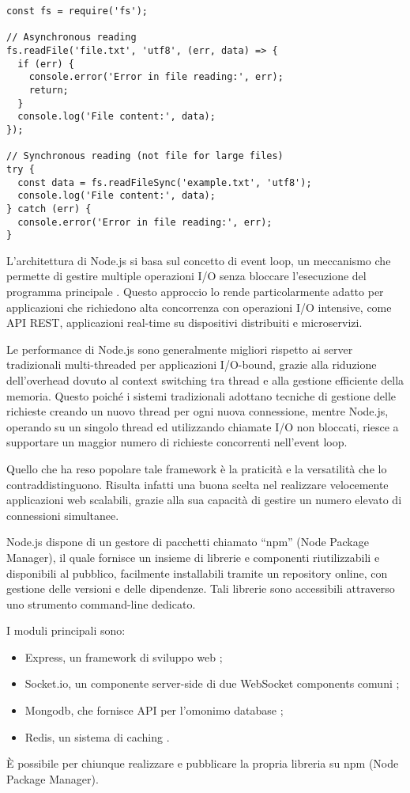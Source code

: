 \begin{lstlisting}[caption={Lettura asincrona di file}, label=lst:node-fs]
const fs = require('fs');

// Asynchronous reading
fs.readFile('file.txt', 'utf8', (err, data) => {
  if (err) {
    console.error('Error in file reading:', err);
    return;
  }
  console.log('File content:', data);
});

// Synchronous reading (not file for large files)
try {
  const data = fs.readFileSync('example.txt', 'utf8');
  console.log('File content:', data);
} catch (err) {
  console.error('Error in file reading:', err);
}
\end{lstlisting}

L'architettura di Node.js si basa sul concetto di event loop, un meccanismo che permette di gestire multiple operazioni I/O senza bloccare l'esecuzione del programma principale \citep{nodejs_docs_2023}. Questo approccio lo rende particolarmente adatto per applicazioni che richiedono alta concorrenza con operazioni I/O intensive, come API REST, applicazioni real-time su dispositivi distribuiti e microservizi.

Le performance di Node.js sono generalmente migliori rispetto ai server tradizionali multi-threaded per applicazioni I/O-bound, grazie alla riduzione dell'overhead dovuto al context switching tra thread e alla gestione efficiente della memoria. Questo poiché i sistemi tradizionali adottano tecniche di gestione delle richieste creando un nuovo thread per ogni nuova connessione, mentre Node.js, operando su un singolo thread ed utilizzando chiamate I/O non bloccati, riesce a supportare un maggior numero di richieste concorrenti nell'event loop.

Quello che ha reso popolare tale framework è la praticità e la versatilità che lo contraddistinguono. Risulta infatti una buona scelta nel realizzare velocemente applicazioni web scalabili, grazie alla sua capacità di gestire un numero elevato di connessioni simultanee.

Node.js dispone di un gestore di pacchetti chiamato ``npm'' (Node Package Manager), il quale fornisce un insieme di librerie e componenti riutilizzabili e disponibili al pubblico, facilmente installabili tramite un repository online, con gestione delle versioni e delle dipendenze. Tali librerie sono accessibili attraverso uno strumento command-line dedicato.

I moduli principali sono:
\begin{itemize}
  \item Express, un framework di sviluppo web \cite{express_js};
  \item Socket.io, un componente server-side di due WebSocket components comuni \cite{socket_io};
  \item Mongodb, che fornisce API per l'omonimo database \cite{mongodb};
  \item Redis, un sistema di caching \cite{redis}.
\end{itemize}
È possibile per chiunque realizzare e pubblicare la propria libreria su npm (Node Package Manager).

